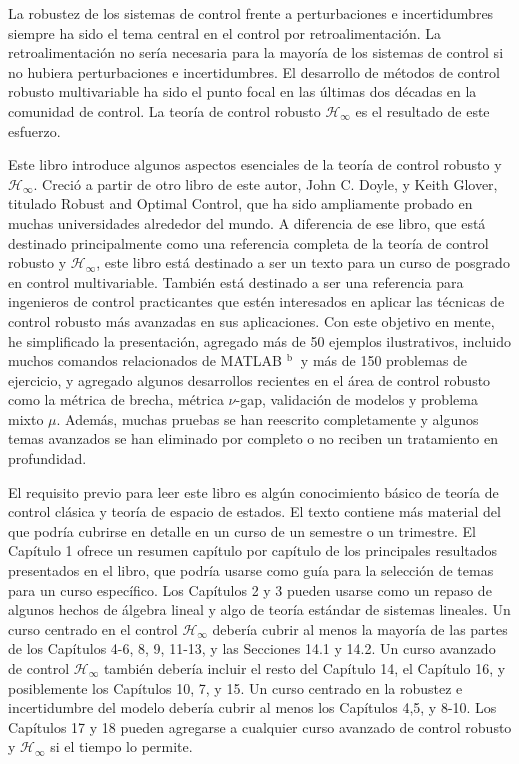 \documentclass[
	spanish, %
	letterpaper, oneside
]{book}
\begin{document}
\begin{abstractd}
	La robustez de los sistemas de control frente a perturbaciones e incertidumbres siempre ha sido el tema central en el control por retroalimentación. La retroalimentación no sería necesaria para la mayoría de los sistemas de control si no hubiera perturbaciones e incertidumbres. El desarrollo de métodos de control robusto multivariable ha sido el punto focal en las últimas dos décadas en la comunidad de control. La teoría de control robusto $\mathcal{H}_{\infty}$ es el resultado de este esfuerzo.

	Este libro introduce algunos aspectos esenciales de la teoría de control robusto y $\mathcal{H}_{\infty}$. Creció a partir de otro libro de este autor, John C. Doyle, y Keith Glover, titulado Robust and Optimal Control, que ha sido ampliamente probado en muchas universidades alrededor del mundo. A diferencia de ese libro, que está destinado principalmente como una referencia completa de la teoría de control robusto y $\mathcal{H}_{\infty}$, este libro está destinado a ser un texto para un curso de posgrado en control multivariable. También está destinado a ser una referencia para ingenieros de control practicantes que estén interesados en aplicar las técnicas de control robusto más avanzadas en sus aplicaciones. Con este objetivo en mente, he simplificado la presentación, agregado más de 50 ejemplos ilustrativos, incluido muchos comandos relacionados de MATLAB ${ }^{\text {b }}$ y más de 150 problemas de ejercicio, y agregado algunos desarrollos recientes en el área de control robusto como la métrica de brecha, métrica $\nu$-gap, validación de modelos y problema mixto $\mu$. Además, muchas pruebas se han reescrito completamente y algunos temas avanzados se han eliminado por completo o no reciben un tratamiento en profundidad.

	El requisito previo para leer este libro es algún conocimiento básico de teoría de control clásica y teoría de espacio de estados. El texto contiene más material del que podría cubrirse en detalle en un curso de un semestre o un trimestre. El Capítulo 1 ofrece un resumen capítulo por capítulo de los principales resultados presentados en el libro, que podría usarse como guía para la selección de temas para un curso específico. Los Capítulos 2 y 3 pueden usarse como un repaso de algunos hechos de álgebra lineal y algo de teoría estándar de sistemas lineales. Un curso centrado en el control $\mathcal{H}_{\infty}$ debería cubrir al menos la mayoría de las partes de los Capítulos 4-6, 8, 9, 11-13, y las Secciones 14.1 y 14.2. Un curso avanzado de control $\mathcal{H}_{\infty}$ también debería incluir el resto del Capítulo 14, el Capítulo 16, y posiblemente los Capítulos 10, 7, y 15. Un curso centrado en la robustez e incertidumbre del modelo debería cubrir al menos los Capítulos 4,5, y 8-10. Los Capítulos 17 y 18 pueden agregarse a cualquier curso avanzado de control robusto y $\mathcal{H}_{\infty}$ si el tiempo lo permite.


\end{abstractd}
\end{document}
